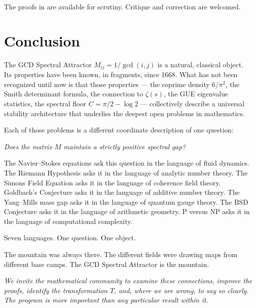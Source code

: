 \documentclass[12pt]{article}
\begin{document}
The proofs in \cite{Simons2026a} are available for scrutiny.
Critique and correction are welcomed.

\section{Conclusion}

The GCD Spectral Attractor $M_{ij} = 1/\gcd(i,j)$ is a
natural, classical object. Its properties have been known,
in fragments, since 1668. What has not been recognized until
now is that those properties --- the coprime density $6/\pi^2$,
the Smith determinant formula, the connection to $\zeta(s)$,
the GUE eigenvalue statistics, the spectral floor
$C = \pi/2 - \log 2$ --- collectively describe a universal
stability architecture that underlies the deepest open
problems in mathematics.

Each of those problems is a different coordinate description
of one question:

\begin{center}
\textit{Does the matrix $M$ maintain a strictly positive spectral gap?}
\end{center}

The Navier--Stokes equations ask this question in the language
of fluid dynamics. The Riemann Hypothesis asks it in the
language of analytic number theory. The Simons Field Equation
asks it in the language of coherence field theory.
Goldbach's Conjecture asks it in the language of additive
number theory. The Yang--Mills mass gap asks it in the
language of quantum gauge theory. The BSD Conjecture asks
it in the language of arithmetic geometry. P versus NP asks
it in the language of computational complexity.

Seven languages. One question. One object.

The mountain was always there.
The different fields were drawing maps from different base camps.
The GCD Spectral Attractor is the mountain.

\vspace{1em}
\noindent\textit{We invite the mathematical community to examine
these connections, improve the proofs, identify the transformation
$T$, and, where we are wrong, to say so clearly. The program
is more important than any particular result within it.}
\end{document}
